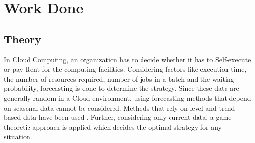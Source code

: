 \vspace{-2in}
\chapter{Work Done}

\section{Theory}
In Cloud Computing, an organization has to decide whether it has to Self-execute or pay Rent for the computing facilities. Considering factors like execution time, the number of resources required, number of jobs in a batch and the waiting probability, forecasting is done to determine the strategy. Since these data are generally random in a Cloud environment, using forecasting methods that depend on seasonal data cannot be considered. Methods that rely on level and trend based data have been used \cite{TimeSeries}. Further, considering only current data, a game theoretic approach is applied which decides the optimal strategy for any situation.
